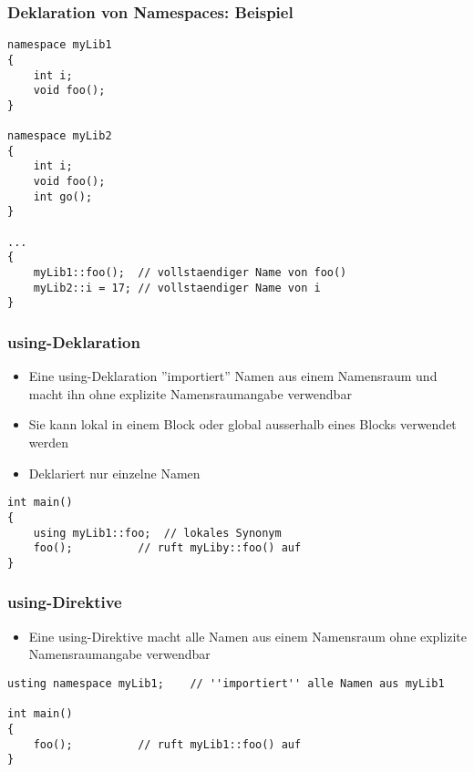 \subsubsection{Deklaration von Namespaces: Beispiel\hfill}
\label{sec:unterunterabschnitt}
\noindent
\begin{minipage}{\linewidth}
\begin{lstlisting}
namespace myLib1
{
	int i;
	void foo();
}

namespace myLib2
{
	int i;
	void foo();
	int go();
}

...
{
	myLib1::foo();	// vollstaendiger Name von foo()
	myLib2::i = 17;	// vollstaendiger Name von i
}
\end{lstlisting}
\end{minipage}

\subsubsection{using-Deklaration\hfill}
\label{sec:unterunterabschnitt}
\begin{itemize}
	\item Eine using-Deklaration ''importiert'' Namen aus einem Namensraum und macht ihn ohne explizite Namensraumangabe verwendbar
	\item Sie kann lokal in einem Block oder global ausserhalb eines Blocks verwendet werden
	\item Deklariert nur einzelne Namen
\end{itemize}
\noindent
\begin{minipage}{\linewidth}
\begin{lstlisting}
int main()
{
	using myLib1::foo;	// lokales Synonym
	foo();			// ruft myLiby::foo() auf
}
\end{lstlisting}
\end{minipage}

\subsubsection{using-Direktive\hfill}
\label{sec:unterunterabschnitt}
\begin{itemize}
	\item Eine using-Direktive macht alle Namen aus einem Namensraum ohne explizite Namensraumangabe verwendbar
\end{itemize}
\noindent
\begin{minipage}{\linewidth}
\begin{lstlisting}
usting namespace myLib1;	// ''importiert'' alle Namen aus myLib1

int main()
{
	foo();			// ruft myLib1::foo() auf
}
\end{lstlisting}
\end{minipage}

